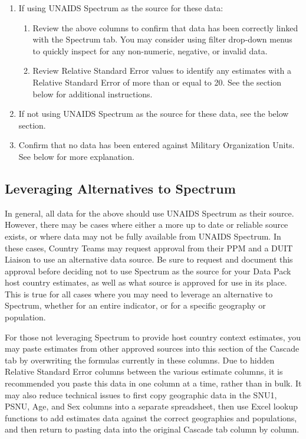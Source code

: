 \documentclass[
  openany]{book}
\begin{document}
\begin{enumerate}
\def\labelenumi{\arabic{enumi}.}
\item
  If using UNAIDS Spectrum as the source for these data:

  \begin{enumerate}
  \def\labelenumii{\alph{enumii}.}
  \item
    Review the above columns to confirm that data has been correctly
    linked with the Spectrum tab. You may consider using filter
    drop-down menus to quickly inspect for any non-numeric,
    negative, or invalid data.
  \item
    Review Relative Standard Error values to identify any estimates
    with a Relative Standard Error of more than or equal to 20. See
    the section below for additional instructions.
  \end{enumerate}
\item
  If not using UNAIDS Spectrum as the source for these data, see the
  below section.
\item
  Confirm that no data has been entered against Military Organization
  Units. See below for more explanation.
\end{enumerate}

\hypertarget{leveraging-alternatives-to-spectrum}{%
\subsection{Leveraging Alternatives to Spectrum}\label{leveraging-alternatives-to-spectrum}}

In general, all data for the above should use UNAIDS Spectrum as their
source. However, there may be cases where either a more up to date or
reliable source exists, or where data may not be fully available from
UNAIDS Spectrum. In these cases, Country Teams may request approval from
their PPM and a DUIT Liaison to use an alternative data source. Be sure
to request and document this approval before deciding not to use
Spectrum as the source for your Data Pack host country estimates, as
well as what source is approved for use in its place. This is true for
all cases where you may need to leverage an alternative to Spectrum,
whether for an entire indicator, or for a specific geography or
population.

For those not leveraging Spectrum to provide host country context
estimates, you may paste estimates from other approved sources into this
section of the Cascade tab by overwriting the formulas currently in
these columns. Due to hidden Relative Standard Error columns between the
various estimate columns, it is recommended you paste this data in one
column at a time, rather than in bulk. It may also reduce technical
issues to first copy geographic data in the SNU1, PSNU, Age, and Sex
columns into a separate spreadsheet, then use Excel lookup functions to
add estimates data against the correct geographies and populations, and
then return to pasting data into the original Cascade tab column by
column.
\end{document}
